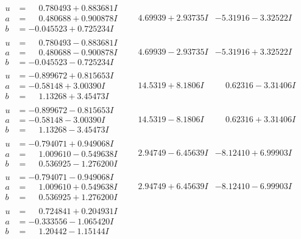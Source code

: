 \documentclass[1p]{elsarticle_modified}
\theoremstyle{definition}
\begin{document}
$$\begin{array}{c|c|c}
\begin{aligned}
u &= \phantom{-}0.780493 + 0.883681 I \\
a &= \phantom{-}0.480688 + 0.900878 I \\
b &= -0.045523 + 0.725234 I\end{aligned}
 & \phantom{-}4.69939 + 2.93735 I & -5.31916 - 3.32522 I \\ \hline\begin{aligned}
u &= \phantom{-}0.780493 - 0.883681 I \\
a &= \phantom{-}0.480688 - 0.900878 I \\
b &= -0.045523 - 0.725234 I\end{aligned}
 & \phantom{-}4.69939 - 2.93735 I & -5.31916 + 3.32522 I \\ \hline\begin{aligned}
u &= -0.899672 + 0.815653 I \\
a &= -0.58148 + 3.00390 I \\
b &= \phantom{-}1.13268 + 3.45473 I\end{aligned}
 & \phantom{-}14.5319 + 8.1806 I & \phantom{-}0.62316 - 3.31406 I \\ \hline\begin{aligned}
u &= -0.899672 - 0.815653 I \\
a &= -0.58148 - 3.00390 I \\
b &= \phantom{-}1.13268 - 3.45473 I\end{aligned}
 & \phantom{-}14.5319 - 8.1806 I & \phantom{-}0.62316 + 3.31406 I \\ \hline\begin{aligned}
u &= -0.794071 + 0.949068 I \\
a &= \phantom{-}1.009610 - 0.549638 I \\
b &= \phantom{-}0.536925 - 1.276200 I\end{aligned}
 & \phantom{-}2.94749 - 6.45639 I & -8.12410 + 6.99903 I \\ \hline\begin{aligned}
u &= -0.794071 - 0.949068 I \\
a &= \phantom{-}1.009610 + 0.549638 I \\
b &= \phantom{-}0.536925 + 1.276200 I\end{aligned}
 & \phantom{-}2.94749 + 6.45639 I & -8.12410 - 6.99903 I \\ \hline\begin{aligned}
u &= \phantom{-}0.724841 + 0.204931 I \\
a &= -0.333556 - 1.065420 I \\
b &= \phantom{-}1.20442 - 1.15144 I\end{aligned}

\end{array}$$
\end{document}
